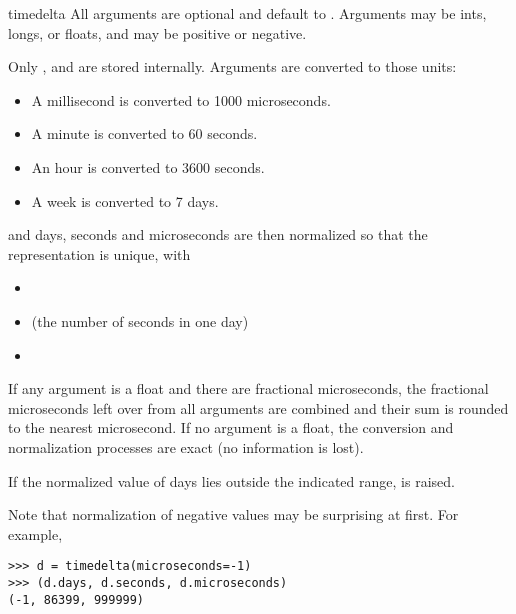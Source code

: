 \begin{classdesc}{timedelta}{}
  All arguments are optional and default to .  Arguments may
  be ints, longs, or floats, and may be positive or negative.

  Only ,  and  are stored
  internally.  Arguments are converted to those units:

\begin{itemize}
  \item A millisecond is converted to 1000 microseconds.
  \item A minute is converted to 60 seconds.
  \item An hour is converted to 3600 seconds.
  \item A week is converted to 7 days.
\end{itemize}

  and days, seconds and microseconds are then normalized so that the
  representation is unique, with

\begin{itemize}
  \item {}
  \item {} (the number of seconds in one day)
  \item {}
\end{itemize}

  If any argument is a float and there are fractional microseconds,
  the fractional microseconds left over from all arguments are combined
  and their sum is rounded to the nearest microsecond.  If no
  argument is a float, the conversion and normalization processes
  are exact (no information is lost).

  If the normalized value of days lies outside the indicated range,
   is raised.

  Note that normalization of negative values may be surprising at first.
  For example,

\begin{verbatim}
>>> d = timedelta(microseconds=-1)
>>> (d.days, d.seconds, d.microseconds)
(-1, 86399, 999999)
\end{verbatim}
\end{classdesc}


